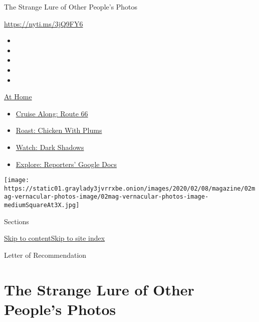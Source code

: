 The Strange Lure of Other People's Photos

\url{https://nyti.ms/3jQ9FY6}

\begin{itemize}
\item
\item
\item
\item
\item
\end{itemize}

\href{https://www.nytimes3xbfgragh.onion/spotlight/at-home?action=click\&pgtype=Article\&state=default\&region=TOP_BANNER\&context=at_home_menu}{At
Home}

\begin{itemize}
\tightlist
\item
  \href{https://www.nytimes3xbfgragh.onion/2020/09/07/travel/route-66.html?action=click\&pgtype=Article\&state=default\&region=TOP_BANNER\&context=at_home_menu}{Cruise
  Along: Route 66}
\item
  \href{https://www.nytimes3xbfgragh.onion/2020/09/04/dining/sheet-pan-chicken.html?action=click\&pgtype=Article\&state=default\&region=TOP_BANNER\&context=at_home_menu}{Roast:
  Chicken With Plums}
\item
  \href{https://www.nytimes3xbfgragh.onion/2020/09/04/arts/television/dark-shadows-stream.html?action=click\&pgtype=Article\&state=default\&region=TOP_BANNER\&context=at_home_menu}{Watch:
  Dark Shadows}
\item
  \href{https://www.nytimes3xbfgragh.onion/interactive/2020/at-home/even-more-reporters-editors-diaries-lists-recommendations.html?action=click\&pgtype=Article\&state=default\&region=TOP_BANNER\&context=at_home_menu}{Explore:
  Reporters' Google Docs}
\end{itemize}

\texttt{[image: https://static01.graylady3jvrrxbe.onion/images/2020/02/08/magazine/02mag-vernacular-photos-image/02mag-vernacular-photos-image-mediumSquareAt3X.jpg]}

Sections

\protect\hyperlink{site-content}{Skip to
content}\protect\hyperlink{site-index}{Skip to site index}

Letter of Recommendation

\hypertarget{the-strange-lure-of-other-peoples-photos}{%
\section{The Strange Lure of Other People's
Photos}\label{the-strange-lure-of-other-peoples-photos}}

